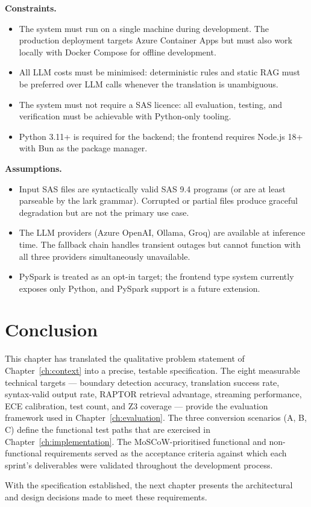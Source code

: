 \textbf{Constraints.}
\begin{itemize}
  \item The system must run on a single machine during development. The
    production deployment targets Azure Container Apps but must also work
    locally with Docker Compose for offline development.
  \item All LLM costs must be minimised: deterministic rules and static RAG
    must be preferred over LLM calls whenever the translation is unambiguous.
  \item The system must not require a SAS licence: all evaluation, testing,
    and verification must be achievable with Python-only tooling.
  \item Python 3.11+ is required for the backend; the frontend requires
    Node.js 18+ with Bun as the package manager.
\end{itemize}

\textbf{Assumptions.}
\begin{itemize}
  \item Input SAS files are syntactically valid SAS 9.4 programs (or are at
    least parseable by the lark grammar). Corrupted or partial files produce
    graceful degradation but are not the primary use case.
  \item The LLM providers (Azure OpenAI, Ollama, Groq) are available at
    inference time. The fallback chain handles transient outages but cannot
    function with all three providers simultaneously unavailable.
  \item PySpark is treated as an opt-in target; the frontend type system
    currently exposes only Python, and PySpark support is a future extension.
\end{itemize}

\section{Conclusion}
\label{sec:ch3-conclusion}

This chapter has translated the qualitative problem statement of
Chapter~\ref{ch:context} into a precise, testable specification. The eight
measurable technical targets --- boundary detection accuracy, translation
success rate, syntax-valid output rate, RAPTOR retrieval advantage, streaming
performance, ECE calibration, test count, and Z3 coverage --- provide the
evaluation framework used in Chapter~\ref{ch:evaluation}. The three conversion
scenarios (A, B, C) define the functional test paths that are exercised in
Chapter~\ref{ch:implementation}. The MoSCoW-prioritised functional and
non-functional requirements served as the acceptance criteria against which each
sprint's deliverables were validated throughout the development process.

With the specification established, the next chapter presents the architectural
and design decisions made to meet these requirements.
